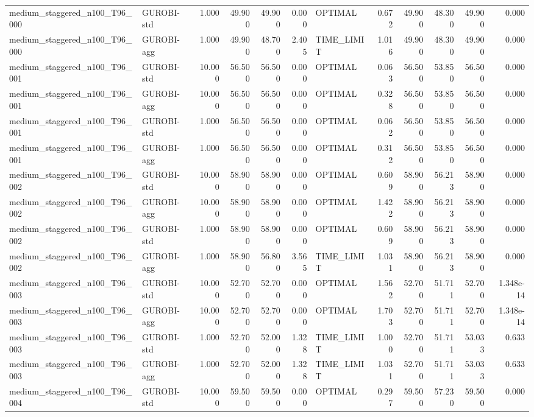 \begin{table}[htbp]
\begin{tabular}{llrrrrlrrrrr}
medium\_staggered\_n100\_T96\_000 & GUROBI-std & 1.000 & 49.900 & 49.900 & 0.000 & OPTIMAL & 0.672 & 49.900 & 48.300 & 49.900 & 0.000 \\
medium\_staggered\_n100\_T96\_000 & GUROBI-agg & 1.000 & 49.900 & 48.700 & 2.405 & TIME\_LIMIT & 1.016 & 49.900 & 48.300 & 49.900 & 0.000 \\
medium\_staggered\_n100\_T96\_001 & GUROBI-std & 10.000 & 56.500 & 56.500 & 0.000 & OPTIMAL & 0.063 & 56.500 & 53.850 & 56.500 & 0.000 \\
medium\_staggered\_n100\_T96\_001 & GUROBI-agg & 10.000 & 56.500 & 56.500 & 0.000 & OPTIMAL & 0.328 & 56.500 & 53.850 & 56.500 & 0.000 \\
medium\_staggered\_n100\_T96\_001 & GUROBI-std & 1.000 & 56.500 & 56.500 & 0.000 & OPTIMAL & 0.062 & 56.500 & 53.850 & 56.500 & 0.000 \\
medium\_staggered\_n100\_T96\_001 & GUROBI-agg & 1.000 & 56.500 & 56.500 & 0.000 & OPTIMAL & 0.312 & 56.500 & 53.850 & 56.500 & 0.000 \\
medium\_staggered\_n100\_T96\_002 & GUROBI-std & 10.000 & 58.900 & 58.900 & 0.000 & OPTIMAL & 0.609 & 58.900 & 56.213 & 58.900 & 0.000 \\
medium\_staggered\_n100\_T96\_002 & GUROBI-agg & 10.000 & 58.900 & 58.900 & 0.000 & OPTIMAL & 1.422 & 58.900 & 56.213 & 58.900 & 0.000 \\
medium\_staggered\_n100\_T96\_002 & GUROBI-std & 1.000 & 58.900 & 58.900 & 0.000 & OPTIMAL & 0.609 & 58.900 & 56.213 & 58.900 & 0.000 \\
medium\_staggered\_n100\_T96\_002 & GUROBI-agg & 1.000 & 58.900 & 56.800 & 3.565 & TIME\_LIMIT & 1.031 & 58.900 & 56.213 & 58.900 & 0.000 \\
medium\_staggered\_n100\_T96\_003 & GUROBI-std & 10.000 & 52.700 & 52.700 & 0.000 & OPTIMAL & 1.562 & 52.700 & 51.711 & 52.700 & 1.348e-14 \\
medium\_staggered\_n100\_T96\_003 & GUROBI-agg & 10.000 & 52.700 & 52.700 & 0.000 & OPTIMAL & 1.703 & 52.700 & 51.711 & 52.700 & 1.348e-14 \\
medium\_staggered\_n100\_T96\_003 & GUROBI-std & 1.000 & 52.700 & 52.000 & 1.328 & TIME\_LIMIT & 1.000 & 52.700 & 51.711 & 53.033 & 0.633 \\
medium\_staggered\_n100\_T96\_003 & GUROBI-agg & 1.000 & 52.700 & 52.000 & 1.328 & TIME\_LIMIT & 1.031 & 52.700 & 51.711 & 53.033 & 0.633 \\
medium\_staggered\_n100\_T96\_004 & GUROBI-std & 10.000 & 59.500 & 59.500 & 0.000 & OPTIMAL & 0.297 & 59.500 & 57.230 & 59.500 & 0.000 \\

\end{tabular}
\end{table}
